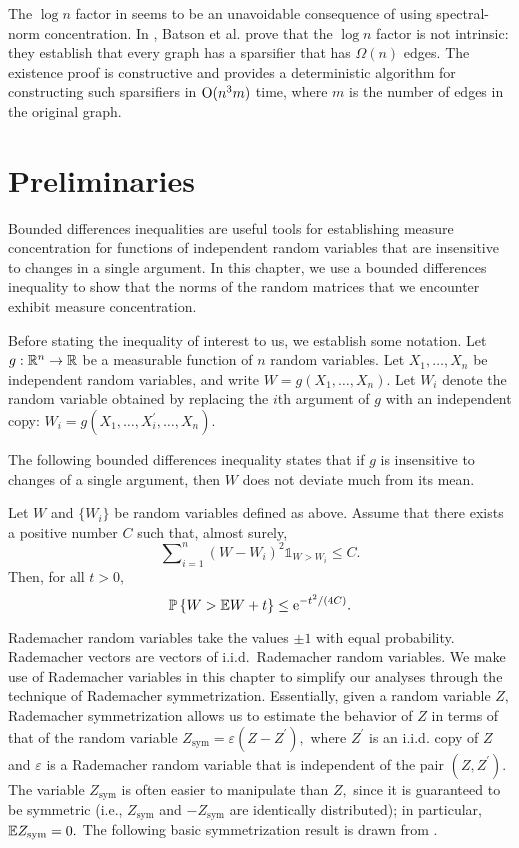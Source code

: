 The $\log n$ factor in \cite{SS08} seems to be an unavoidable consequence of
using spectral-norm concentration. In \cite{BSS08}, Batson et al. prove that
the $\log n$ factor is not intrinsic: they establish that every graph has a
sparsifier that has $\Omega(n)$ edges. The existence proof is constructive and provides a
deterministic algorithm for constructing such sparsifiers in
$\mathrm{O}(n^3m)$ time, where $m$ is the number of edges in the original graph.

\section{Preliminaries}

Bounded differences inequalities are useful tools for establishing measure 
concentration for functions of independent random variables that are insensitive
to changes in a single argument. In this chapter, we use a 
bounded differences inequality to show that the norms of the random matrices
that we encounter exhibit measure concentration.

Before stating the inequality of interest to us, we 
establish some notation. Let $g:\mathbb{R}^{n}\rightarrow\mathbb{R}$ be a measurable
function of $n$ random variables. Let $X_{1},\ldots,X_{n}$ be independent random
variables, and write $W=g(X_{1},\ldots,X_{n})$. Let $W_i$ denote the random
variable obtained by replacing the $i$th argument of $g$ with an independent
copy: $W_{i}=g(X_{1},\dots,X_{i}^{\prime},\ldots,X_{n})$. 

The following bounded differences inequality states that if $g$ is insensitive
to changes of a single argument, then $W$ does not deviate much from its mean.
\begin{lemma}
Let $W$ and $\{W_i\}$ be random variables defined as above. Assume that there
exists a positive number $C$ such that, almost surely, 
\[
\sum\nolimits_{i=1}^{n}(W-W_{i})^{2}\mathds{1}_{W>W_{i}}\leq C.
\]
Then, for all $t>0,$
\[
\mathbb{P}\left\{W>\mathbb{E} W+t\right\}\leq \mathrm{e}^{-t^{2}/(4C)}.
\]
\label{ch2:lem:logsob}
\end{lemma}

Rademacher random variables take the values $\pm 1$ with equal
probability. Rademacher vectors are vectors of i.i.d.\ Rademacher random
variables. We make use of Rademacher variables in this chapter to simplify our analyses 
through the technique of Rademacher symmetrization. Essentially, given
 a random variable $Z,$ Rademacher symmetrization allows us to estimate the behavior
 of $Z$ in terms of that of the random variable $Z_\text{sym} = \varepsilon(Z - Z^\prime),$
 where $Z^\prime$ is an i.i.d. copy of $Z$ and $\varepsilon$ is a Rademacher
 random variable that is independent of the pair $(Z, Z^\prime).$ The variable
 $Z_\text{sym}$ is often easier to manipulate than $Z,$ since it is guaranteed
  to be symmetric (i.e., $Z_\text{sym}$ and $-Z_\text{sym}$ are identically distributed);
  in particular, $\mathbb{E} Z_\text{sym}=0.$ The following
basic symmetrization result is drawn from \cite[Lemma
2.3.1 et seq.]{vdVW}.

